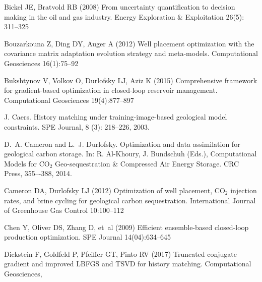\documentclass[11pt]{article}
\begin{document}
\begin{thebibliography}{51}
Bickel JE, Bratvold RB (2008) From uncertainty quantification to decision making in the oil and gas industry.
  Energy Exploration \& Exploitation 26(5): 311--325

Bouzarkouna Z, Ding DY, Auger A (2012) Well placement optimization with the
  covariance matrix adaptation evolution strategy and meta-models.
  Computational Geosciences 16(1):75--92

Bukshtynov V, Volkov O, Durlofsky LJ, Aziz K (2015) Comprehensive framework for
  gradient-based optimization in closed-loop reservoir management.
  Computational Geosciences 19(4):877--897

J. Caers.
History matching under training-image-based geological model constraints.
SPE Journal, 8 (3): 218--226, 2003.

D.~A. Cameron and L.~J. Durlofsky.
Optimization and data assimilation for geological carbon storage.
\newblock In: R. Al-Khoury, J. Bundschuh (Eds.), Computational Models for CO$_2$ Geo-sequestration \& Compressed Air Energy
Storage. CRC Press, 355–-388, 2014.

Cameron DA, Durlofsky LJ (2012) Optimization of well placement, CO$_2$ injection
  rates, and brine cycling for geological carbon sequestration. International
  Journal of Greenhouse Gas Control 10:100--112

Chen Y, Oliver DS, Zhang D, et~al (2009) Efficient ensemble-based closed-loop
  production optimization. SPE Journal 14(04):634--645

Dickstein F, Goldfeld P, Pfeiffer GT, Pinto RV (2017)
Truncated conjugate gradient and improved LBFGS and TSVD for history matching.
Computational Geosciences,



\end{thebibliography}
\end{document}

